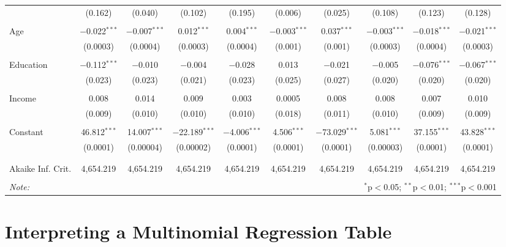 \documentclass[
  letterpaper,
  DIV=11,
  numbers=noendperiod]{scrreprt}
\begin{document}
\begin{table}[H]
\begin{tabular}{@{\extracolsep{-15pt}}lccccccccc}
  & (0.162) & (0.040) & (0.102) & (0.195) & (0.006) & (0.025) & (0.108) & (0.123) & (0.128) \\ 
  & & & & & & & & & \\ 
 Age & $-$0.022$^{***}$ & $-$0.007$^{***}$ & 0.012$^{***}$ & 0.004$^{***}$ & $-$0.003$^{***}$ & 0.037$^{***}$ & $-$0.003$^{***}$ & $-$0.018$^{***}$ & $-$0.021$^{***}$ \\ 
  & (0.0003) & (0.0004) & (0.0003) & (0.0004) & (0.001) & (0.001) & (0.0003) & (0.0004) & (0.0003) \\ 
  & & & & & & & & & \\ 
 Education & $-$0.112$^{***}$ & $-$0.010 & $-$0.004 & $-$0.028 & 0.013 & $-$0.021 & $-$0.005 & $-$0.076$^{***}$ & $-$0.067$^{***}$ \\ 
  & (0.023) & (0.023) & (0.021) & (0.023) & (0.025) & (0.027) & (0.020) & (0.020) & (0.020) \\ 
  & & & & & & & & & \\ 
 Income & 0.008 & 0.014 & 0.009 & 0.003 & 0.0005 & 0.008 & 0.008 & 0.007 & 0.010 \\ 
  & (0.009) & (0.010) & (0.010) & (0.010) & (0.018) & (0.011) & (0.010) & (0.009) & (0.009) \\ 
  & & & & & & & & & \\ 
 Constant & 46.812$^{***}$ & 14.007$^{***}$ & $-$22.189$^{***}$ & $-$4.006$^{***}$ & 4.506$^{***}$ & $-$73.029$^{***}$ & 5.081$^{***}$ & 37.155$^{***}$ & 43.828$^{***}$ \\ 
  & (0.0001) & (0.00004) & (0.00002) & (0.0001) & (0.0001) & (0.0001) & (0.00003) & (0.0001) & (0.0001) \\ 
  & & & & & & & & & \\ 
\hline \\[-1.8ex] 
Akaike Inf. Crit. & 4,654.219 & 4,654.219 & 4,654.219 & 4,654.219 & 4,654.219 & 4,654.219 & 4,654.219 & 4,654.219 & 4,654.219 \\ 
\hline 
\hline \\[-1.8ex] 
\textit{Note:}  & \multicolumn{9}{r}{$^{*}$p$<$0.05; $^{**}$p$<$0.01; $^{***}$p$<$0.001} \\ 
\end{tabular} 
\end{table} 
\elandscape

\hypertarget{interpreting-a-multinomial-regression-table}{%
\chapter{Interpreting a Multinomial Regression
Table}\label{interpreting-a-multinomial-regression-table}}
\end{document}
